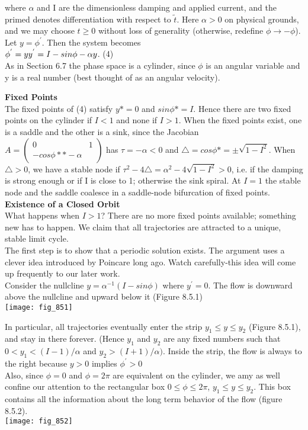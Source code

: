\documentclass{article}
\newcommand\tab[1][1cm]{\hspace*{#1}}
\begin{document}
where $\alpha$ and I are the dimensionless damping and applied current, and the primed denotes differentiation with respect to $\tilde{t}$. Here $\alpha > 0$ on physical grounds, and we may choose $t \geq 0$ without loss of generality (otherwise, redefine $\phi \to -\phi$). \\ \tab
Let $y=\phi^{'}$. Then the system becomes \\ \tab \tab
$\phi^{'}=y \\
y^{'}=I-sin\phi-\alpha y$. \tab (4) \\ 
As in Section 6.7 the phase space is a cylinder, since $\phi$ is an angular variable and y is a real number (best thought of as an angular velocity). 

\textbf {Fixed Points} \\ \tab
The fixed points of (4) satisfy $y*=0$ and $sin\phi*=I$. Hence there are two fixed points on the cylinder if $I<1$ and none if $I>1$. When the fixed points exist, one is a saddle and the other is a sink, since the Jacobian \\
${A=
\begin{pmatrix}
0 & 1 \\
-cos\phi* * -\alpha
\end{pmatrix}
}$
has $\tau = -\alpha < 0$ and $\triangle = cos\phi *=\pm \sqrt{1-I^{2}}$. When $\triangle > 0$, we have a stable node if $\tau^{2}-4\triangle = \alpha^{2}-4\sqrt{1-I^{2}}>0$, i.e. if the damping is strong enough or if I is close to 1; otherwise the sink spiral. At $I=1$ the stable node and the saddle coalesce in a saddle-node bifurcation of fixed points. 
\textbf{Existence of a Closed Orbit} \\ \tab
What happens when $I>1$? There are no more fixed points available; something new has to happen. We claim that all trajectories are attracted to a unique, stable limit cycle. \\ \tab
The first step is to show that a periodic solution exists. The argument uses a clever idea introduced by Poincare long ago. Watch carefully-this idea will come up frequently to our later work. \\ \tab
Consider the nullcline $y=\alpha^{-1}(I-sin\phi)$ where $y^{'}=0$. The flow is downward above the nullcline and upward below it (Figure 8.5.1) \\
\texttt{[image: fig\_851]}
 
In particular, all trajectories eventually enter the strip $y_{1} \leq y \leq y_{2}$ (Figure 8.5.1), and stay in there forever. (Hence $y_{1}$ and $y_{2}$ are any fixed numbers such that $0 < y_{1}<(I-1)/\alpha$ and $y_{2}> (I+1)/\alpha)$. Inside the strip, the flow is always to the right because $y>0$ implies $\phi^{'}>0$ \\
Also, since $\phi=0$ and $\phi=2\pi$ are equivalent on the cylinder, we amy as well confine our attention to the rectangular box $0 \leq \phi \leq 2\pi$, $y_{1}\leq y \leq y_{2}$. This box contains all the information about the long term behavior of the flow (figure 8.5.2). \\
\texttt{[image: fig\_852]}
\end{document}
